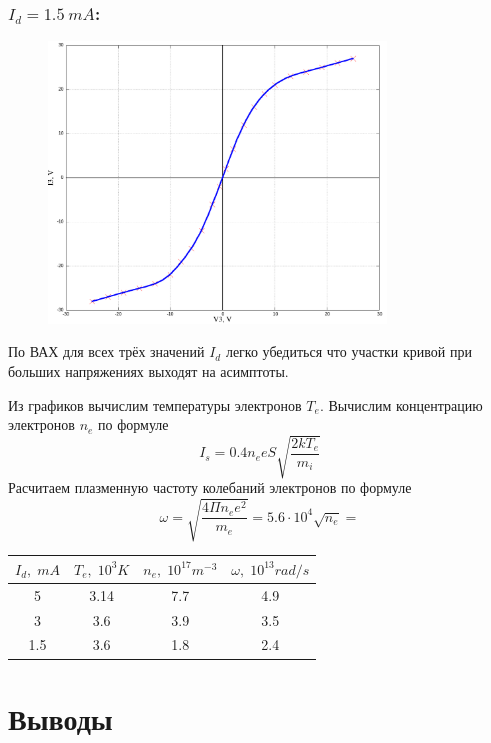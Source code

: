 \documentclass{article}
\begin{document}
\subsubsection*{\(I_d = 1.5\: mA\):}
\begin{figure}[H]
    \centering
    \includegraphics[width=0.8\textwidth]{V-A-1.5.png}
\end{figure}

По ВАХ для всех трёх значений \(I_d\) легко убедиться что участки кривой при больших напряжениях
выходят на асимптоты.

Из графиков вычислим температуры электронов \(T_e\).
Вычислим концентрацию электронов \(n_e\) по формуле
\[ I_s = 0.4n_eeS\sqrt{\frac{2kT_e}{m_i}} \]
Расчитаем плазменную частоту колебаний электронов по формуле
\[ \omega = \sqrt{\frac{4\Pi n_e e^2}{m_e}} = 5.6\cdot 10^4 \sqrt{n_e} =  \]



\begin{table}[H]
    \centering
    \begin{tabular}{|c|c|c|c|}
    \hline
    \(I_d,\; mA\)&\(T_e,\; 10^{3}K\) & \(n_e,\; 10^{17}m^{-3}\) & \(\omega,\; 10^{13}rad/s\) \\\hline
    5   &  3.14 & 7.7  & 4.9 \\\hline
    3   &  3.6  & 3.9  & 3.5 \\\hline
    1.5 &  3.6  & 1.8  & 2.4 \\\hline

    \end{tabular}
\end{table}

\section{Выводы}
\end{document}

